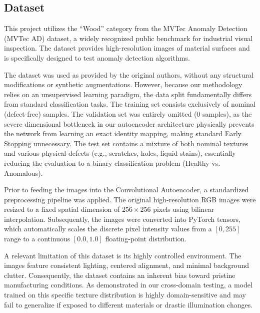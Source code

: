 \documentclass[10pt,twocolumn,a4paper]{article}
\begin{document}
\subsection{Dataset}

This project utilizes the ``Wood'' category from the MVTec Anomaly Detection (MVTec AD) dataset, a widely recognized public benchmark for industrial visual inspection. The dataset provides high-resolution images of material surfaces and is specifically designed to test anomaly detection algorithms.

The dataset was used as provided by the original authors, without any structural modifications or synthetic augmentations. However, because our methodology relies on an unsupervised learning paradigm, the data split fundamentally differs from standard classification tasks. The training set consists exclusively of nominal (defect-free) samples. The validation set was entirely omitted (0 samples), as the severe dimensional bottleneck in our autoencoder architecture physically prevents the network from learning an exact identity mapping, making standard Early Stopping unnecessary. The test set contains a mixture of both nominal textures and various physical defects (e.g., scratches, holes, liquid stains), essentially reducing the evaluation to a binary classification problem (Healthy vs. Anomalous).

Prior to feeding the images into the Convolutional Autoencoder, a standardized preprocessing pipeline was applied. The original high-resolution RGB images were resized to a fixed spatial dimension of $256 \times 256$ pixels using bilinear interpolation. Subsequently, the images were converted into PyTorch tensors, which automatically scales the discrete pixel intensity values from a $[0, 255]$ range to a continuous $[0.0, 1.0]$ floating-point distribution. 

A relevant limitation of this dataset is its highly controlled environment. The images feature consistent lighting, centered alignment, and minimal background clutter. Consequently, the dataset contains an inherent bias toward pristine manufacturing conditions. As demonstrated in our cross-domain testing, a model trained on this specific texture distribution is highly domain-sensitive and may fail to generalize if exposed to different materials or drastic illumination changes.
\end{document}
